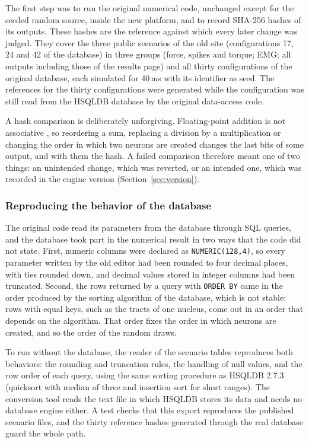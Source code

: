 \documentclass[pdflatex,sn-apa,iicol]{sn-jnl}
\providecommand{\code}[1]{\texttt{#1}}
\begin{document}
The first step was to run the original numerical code, unchanged except for the seeded random source, inside the new platform, and to record SHA-256 hashes of its outputs. These hashes are the reference against which every later change was judged. They cover the three public scenarios of the old site (configurations 17, 24 and 42 of the database) in three groups (force, spikes and torque; EMG; all outputs including those of the results page) and all thirty configurations of the original database, each simulated for 40\,ms with its identifier as seed. The references for the thirty configurations were generated while the configuration was still read from the HSQLDB database by the original data-access code.

A hash comparison is deliberately unforgiving. Floating-point addition is not associative \citep{Goldberg1991}, so reordering a sum, replacing a division by a multiplication or changing the order in which two neurons are created changes the last bits of some output, and with them the hash. A failed comparison therefore meant one of two things: an unintended change, which was reverted, or an intended one, which was recorded in the engine version (Section~\ref{sec:version}).

\subsubsection{Reproducing the behavior of the database}\label{sec:hsqldb}

The original code read its parameters from the database through SQL queries, and the database took part in the numerical result in two ways that the code did not state. First, numeric columns were declared as \code{NUMERIC(128,4)}, so every parameter written by the old editor had been rounded to four decimal places, with ties rounded down, and decimal values stored in integer columns had been truncated. Second, the rows returned by a query with \code{ORDER BY} came in the order produced by the sorting algorithm of the database, which is not stable: rows with equal keys, such as the tracts of one nucleus, come out in an order that depends on the algorithm. That order fixes the order in which neurons are created, and so the order of the random draws.

To run without the database, the reader of the scenario tables reproduces both behaviors: the rounding and truncation rules, the handling of null values, and the row order of each query, using the same sorting procedure as HSQLDB 2.7.3 (quicksort with median of three and insertion sort for short ranges). The conversion tool reads the text file in which HSQLDB stores its data and needs no database engine either. A test checks that this export reproduces the published scenario files, and the thirty reference hashes generated through the real database guard the whole path.
\end{document}
